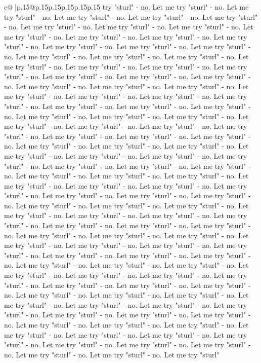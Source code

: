 \documentclass{article}
\begin{document}
{\begin{supertabular}{c@{$\;$}|p{.15\linewidth}@{}p{.15\linewidth}p{.15\linewidth}p{.15\linewidth}p{.15\linewidth}p{.15\linewidth}}
{{{try "sturl" {-} no. Let me try "sturl" {-} no. Let me try "sturl" {-} no. Let me try "sturl" {-} no. Let me try "sturl" {-} no. Let me try "sturl" {-} no. Let me try "sturl" {-} no. Let me try "sturl" {-} no. Let me try "sturl" {-} no. Let me try "sturl" {-} no. Let me try "sturl" {-} no. Let me try "sturl" {-} no. Let me try "sturl" {-} no. Let me try "sturl" {-} no. Let me try "sturl" {-} no. Let me try "sturl" {-} no. Let me try "sturl" {-} no. Let me try "sturl" {-} no. Let me try "sturl" {-} no. Let me try "sturl" {-} no. Let me try "sturl" {-} no. Let me try "sturl" {-} no. Let me try "sturl" {-} no. Let me try "sturl" {-} no. Let me try "sturl" {-} no. Let me try "sturl" {-} no. Let me try "sturl" {-} no. Let me try "sturl" {-} no. Let me try "sturl" {-} no. Let me try "sturl" {-} no. Let me try "sturl" {-} no. Let me try "sturl" {-} no. Let me try "sturl" {-} no. Let me try "sturl" {-} no. Let me try "sturl" {-} no. Let me try "sturl" {-} no. Let me try "sturl" {-} no. Let me try "sturl" {-} no. Let me try "sturl" {-} no. Let me try "sturl" {-} no. Let me try "sturl" {-} no. Let me try "sturl" {-} no. Let me try "sturl" {-} no. Let me try "sturl" {-} no. Let me try "sturl" {-} no. Let me try "sturl" {-} no. Let me try "sturl" {-} no. Let me try "sturl" {-} no. Let me try "sturl" {-} no. Let me try "sturl" {-} no. Let me try "sturl" {-} no. Let me try "sturl" {-} no. Let me try "sturl" {-} no. Let me try "sturl" {-} no. Let me try "sturl" {-} no. Let me try "sturl" {-} no. Let me try "sturl" {-} no. Let me try "sturl" {-} no. Let me try "sturl" {-} no. Let me try "sturl" {-} no. Let me try "sturl" {-} no. Let me try "sturl" {-} no. Let me try "sturl" {-} no. Let me try "sturl" {-} no. Let me try "sturl" {-} no. Let me try "sturl" {-} no. Let me try "sturl" {-} no. Let me try "sturl" {-} no. Let me try "sturl" {-} no. Let me try "sturl" {-} no. Let me try "sturl" {-} no. Let me try "sturl" {-} no. Let me try "sturl" {-} no. Let me try "sturl" {-} no. Let me try "sturl" {-} no. Let me try "sturl" {-} no. Let me try "sturl" {-} no. Let me try "sturl" {-} no. Let me try "sturl" {-} no. Let me try "sturl" {-} no. Let me try "sturl" {-} no. Let me try "sturl" {-} no. Let me try "sturl" {-} no. Let me try "sturl" {-} no. Let me try "sturl" {-} no. Let me try "sturl" {-} no. Let me try "sturl" {-} no. Let me try "sturl" {-} no. Let me try "sturl" {-} no. Let me try "sturl" {-} no. Let me try "sturl" {-} no. Let me try "sturl" {-} no. Let me try "sturl" {-} no. Let me try "sturl" {-} no. Let me try "sturl" {-} no. Let me try "sturl" {-} no. Let me try "sturl" {-} no. Let me try "sturl" {-} no. Let me try "sturl" {-} no. Let me try "sturl" {-} no. Let me try "sturl" {-} no. Let me try "sturl" {-} no. Let me try "sturl" {-} no. Let me try "sturl" {-} no. Let me try "sturl" {-} no. Let me try "sturl" {-} no. Let me try "sturl" {-} no. Let me try "sturl" {-} no. Let me try "sturl" {-} no. Let me try "sturl" {-} no. Let me try "sturl" {-} no. Let me try "sturl" {-} no. Let me try "sturl" {-} no. Let me try "sturl" {-} no. Let me try "sturl" {-} no. Let me try "sturl" {-} no. Let me try "sturl" {-} no. Let me try "sturl" {-} no. Let me try "sturl" }}}
\end{supertabular}}
\end{document}
